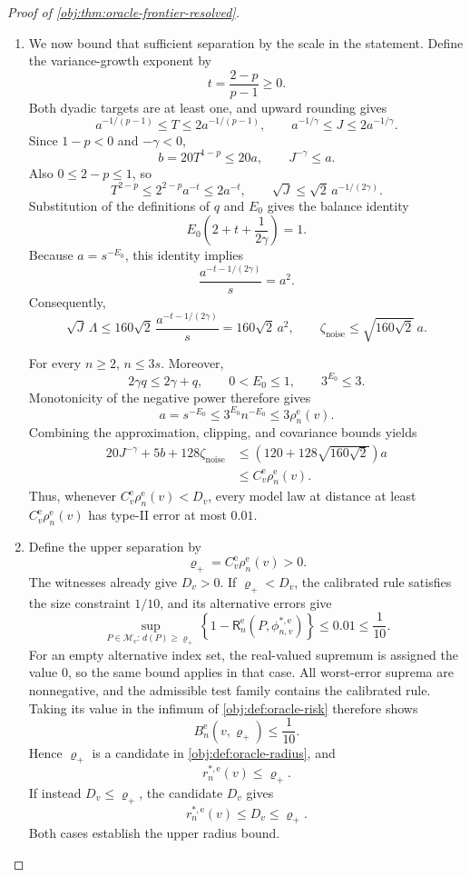 \begin{proof}[Proof of \cref{obj:thm:oracle-frontier-resolved}]
\begin{enumerate}
\item We now bound that sufficient separation by the scale in the statement. Define the variance-growth exponent by
\[
t=\frac{2-p}{p-1}\ge0.
\]
Both dyadic targets are at least one, and upward rounding gives
\[
a^{-1/(p-1)}\le T\le2a^{-1/(p-1)},
\qquad
a^{-1/\gamma}\le J\le2a^{-1/\gamma}.
\]
Since \(1-p<0\) and \(-\gamma<0\),
\[
b=20T^{1-p}\le20a,
\qquad
J^{-\gamma}\le a.
\]
Also \(0\le2-p\le1\), so
\[
T^{2-p}
\le2^{2-p}a^{-t}\le2a^{-t},
\qquad
\sqrt J\le\sqrt2\,a^{-1/(2\gamma)}.
\]
Substitution of the definitions of \(q\) and \(E_0\) gives the balance identity
\[
E_0\left(2+t+\frac1{2\gamma}\right)=1.
\]
Because \(a=s^{-E_0}\), this identity implies
\[
\frac{a^{-t-1/(2\gamma)}}s=a^2.
\]
Consequently,
\[
\sqrt J\,\Lambda
\le160\sqrt2\,\frac{a^{-t-1/(2\gamma)}}s
=160\sqrt2\,a^2,
\qquad
\zeta_{\mathrm{noise}}\le\sqrt{160\sqrt2}\,a.
\]

For every \(n\ge2\), \(n\le3s\). Moreover,
\[
2\gamma q\le2\gamma+q,\qquad 0<E_0\le1,
\qquad 3^{E_0}\le3.
\]
Monotonicity of the negative power therefore gives
\[
a=s^{-E_0}
\le3^{E_0}n^{-E_0}
\le3\rho_n^{\mathrm e}(v).
\]
Combining the approximation, clipping, and covariance bounds yields
\[
\begin{aligned}
20J^{-\gamma}+5b+128\zeta_{\mathrm{noise}}
&\le\left(120+128\sqrt{160\sqrt2}\right)a\\
&\le C^{\mathrm e}_v\rho_n^{\mathrm e}(v).
\end{aligned}
\]
Thus, whenever \(C^{\mathrm e}_v\rho_n^{\mathrm e}(v)<D_v\), every model law at distance at least \(C^{\mathrm e}_v\rho_n^{\mathrm e}(v)\) has type-II error at most \(0.01\).

\item Define the upper separation by
\[
\varrho_+=C^{\mathrm e}_v\rho_n^{\mathrm e}(v)>0.
\]
The witnesses already give \(D_v>0\). If \(\varrho_+<D_v\), the calibrated rule satisfies the size constraint \(1/10\), and its alternative errors give
\[
\sup_{P\in\mathcal M_v:\,d(P)\ge\varrho_+}
\left\{1-\mathsf R_n^{\mathrm e}(P,\phi^{*,\mathrm e}_{n,v})\right\}
\le0.01\le\frac1{10}.
\]
For an empty alternative index set, the real-valued supremum is assigned the value \(0\), so the same bound applies in that case. All worst-error suprema are nonnegative, and the admissible test family contains the calibrated rule. Taking its value in the infimum of \cref{obj:def:oracle-risk} therefore shows
\[
B_n^{\mathrm e}(v,\varrho_+)\le\frac1{10}.
\]
Hence \(\varrho_+\) is a candidate in \cref{obj:def:oracle-radius}, and
\[
r_n^{*,\mathrm e}(v)\le\varrho_+.
\]
If instead \(D_v\le\varrho_+\), the candidate \(D_v\) gives
\[
r_n^{*,\mathrm e}(v)\le D_v\le\varrho_+.
\]
Both cases establish the upper radius bound.


\end{enumerate}
\end{proof}
